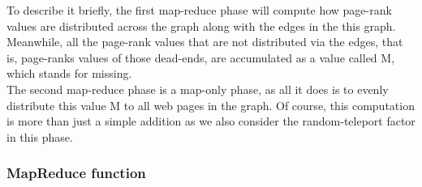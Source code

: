 \documentclass[a4paper]{article}
\begin{document}
To describe it briefly, the first map-reduce phase will compute how page-rank values are distributed across the graph along with the edges in the this graph. Meanwhile, all the page-rank values that are not distributed via the edges, that is, page-ranks values of those dead-ends, are accumulated as a value called M, which stands for missing.\\
The second map-reduce phase is a map-only phase, as all it does is to evenly distribute this value M to all web pages in the graph. Of course, this computation is more than just a simple addition as we also consider the random-teleport factor in this phase.

\subsubsection{MapReduce function}
\end{document}
